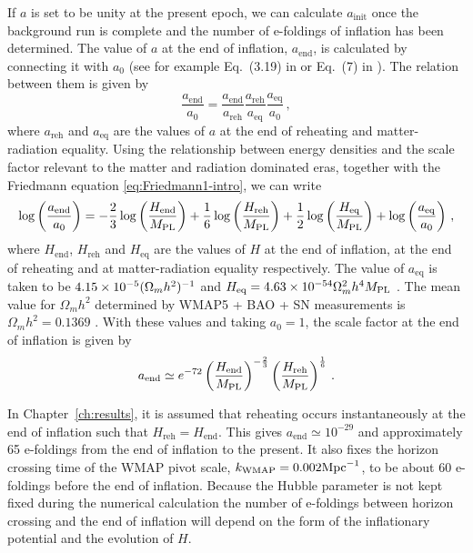If $a$ is set to be unity at the present epoch, we can calculate
$a_{\mathrm{init}}$ once the background run is complete and the number of e-foldings
of inflation has been determined.
The value of $a$ at the end of inflation, $a_\mathrm{end}$, is calculated by
connecting it with $a_0$ (see for example
Eq.~(3.19) in  or Eq.~(7) in ). 
The relation between them is given by
% 
\begin{equation}
 \label{eq:connection-num}
\frac{a_\mathrm{end}}{a_0} = \frac{a_\mathrm{end}}{a_\mathrm{reh}}
			     \frac{a_\mathrm{reh}}{a_\mathrm{eq}}
			     \frac{a_\mathrm{eq}}{a_\mathrm{0}}\,,
\end{equation}
% 
where $a_\mathrm{reh}$ and $a_\mathrm{eq}$ are the values of $a$ at the end of
reheating and matter-radiation equality. Using the relationship between energy
densities and the scale factor relevant to the matter and radiation dominated
eras, together with the Friedmann
equation \eqref{eq:Friedmann1-intro}, we can write
% 
\begin{equation}
 \label{eq:conn2-num}
\log\left(\frac{a_\mathrm{end}}{a_0}\right) =
 -\frac{2}{3}\log\left(\frac{H_\mathrm{end}}{M_{\mathrm{PL}}}\right)
 + \frac{1}{6}\log\left(\frac{H_\mathrm{reh}}{M_{\mathrm{PL}}}\right)
 + \frac{1}{2}\log\left(\frac{H_\mathrm{eq}}{M_{\mathrm{PL}}}\right)
 + \log\left(\frac{a_\mathrm{eq}}{a_0}\right)\,,
\end{equation}
% 
where $H_\mathrm{end}$, $H_\mathrm{reh}$ and $H_\mathrm{eq}$ are the values of $H$
at the end of inflation, at the end of reheating and at matter-radiation equality
respectively.
The value
of $a_\mathrm{eq}$ is taken to be $4.15\times 10^{-5} (\Omega_m h^2)^{-1}$ and
$H_\mathrm{eq}=4.63\times 10^{-54} \Omega_m^2 h^4 M_{\mathrm{PL}}$ \cite{Peiris:2008be, book:dodelson}.
The mean value for $\Omega_m h^2$ determined by WMAP5 + BAO + SN measurements is
$\Omega_m h^2 =0.1369$ \cite{Komatsu:2008hk}. With these values and taking
$a_0=1$, the scale factor at the end of inflation is given by
% 
\begin{equation}
\label{eq:aend-num}
a_\mathrm{end} \simeq e^{-72}
\left(\frac{H_\mathrm{end}}{M_{\mathrm{PL}}}\right)^{-\frac{2}{3}} 
\left(\frac{H_\mathrm{reh}}{M_{\mathrm{PL}}}\right)^{\frac{1}{6}}\,.
\end{equation}
% 


In Chapter~\ref{ch:results}, it is assumed that
reheating occurs instantaneously at the end of
inflation such that $H_\mathrm{reh} = H_\mathrm{end}$. This gives
$a_\mathrm{end} \simeq 10^{-29}$ and approximately 65
e-foldings from the end of inflation to the present. It also fixes the horizon
crossing
time of the WMAP pivot scale, $k_\mathrm{WMAP}=0.002\mathrm{Mpc}^{-1}$, to be about 60 e-foldings
before
the end of inflation. Because the Hubble parameter is not kept fixed during the
numerical calculation the
number of e-foldings between horizon crossing and the end of inflation will depend
on the form of the inflationary potential and the evolution of $H$. 


